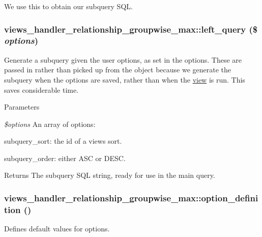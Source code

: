 We use this to obtain our subquery SQL. \hypertarget{classviews__handler__relationship__groupwise__max_af16a972d2e2cccfc5d56495c9e15f42f}{
\subsubsection[{left\_\-query}]{\setlength{\rightskip}{0pt plus 5cm}views\_\-handler\_\-relationship\_\-groupwise\_\-max::left\_\-query (\$ {\em options})}}
\label{classviews__handler__relationship__groupwise__max_af16a972d2e2cccfc5d56495c9e15f42f}
Generate a subquery given the user options, as set in the options. These are passed in rather than picked up from the object because we generate the subquery when the options are saved, rather than when the \hyperlink{classview}{view} is run. This saves considerable time.


\begin{DoxyParams}{Parameters}
\item[{\em \$options}]An array of options:
\begin{DoxyItemize}
\item subquery\_\-sort: the id of a views sort.
\item subquery\_\-order: either ASC or DESC. 
\end{DoxyItemize}\end{DoxyParams}
\begin{DoxyReturn}{Returns}
The subquery SQL string, ready for use in the main query. 
\end{DoxyReturn}
\hypertarget{classviews__handler__relationship__groupwise__max_a915d653a4dd09cc8968c616427a87f92}{
\subsubsection[{option\_\-definition}]{\setlength{\rightskip}{0pt plus 5cm}views\_\-handler\_\-relationship\_\-groupwise\_\-max::option\_\-definition ()}}
\label{classviews__handler__relationship__groupwise__max_a915d653a4dd09cc8968c616427a87f92}
Defines default values for options. 

